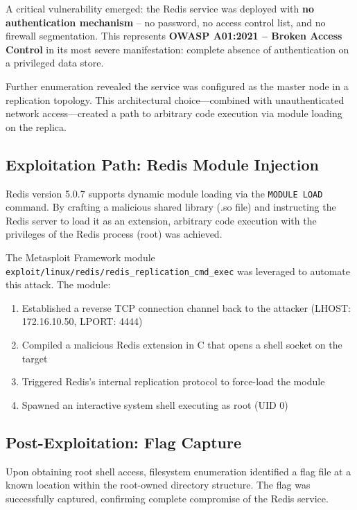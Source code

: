 \documentclass[11pt,a4paper]{article}
\begin{document}
A critical vulnerability emerged: the Redis service was deployed with \textbf{no authentication mechanism} -- no password, no access control list, and no firewall segmentation. This represents \textbf{OWASP A01:2021 -- Broken Access Control} in its most severe manifestation: complete absence of authentication on a privileged data store.

Further enumeration revealed the service was configured as the master node in a replication topology. This architectural choice—combined with unauthenticated network access—created a path to arbitrary code execution via module loading on the replica.

\subsection{Exploitation Path: Redis Module Injection}

Redis version 5.0.7 supports dynamic module loading via the \texttt{MODULE LOAD} command. By crafting a malicious shared library (.so file) and instructing the Redis server to load it as an extension, arbitrary code execution with the privileges of the Redis process (root) was achieved.

The Metasploit Framework module \texttt{exploit/linux/redis/redis\_replication\_cmd\_exec} was leveraged to automate this attack. The module:

\begin{enumerate}
    \item Established a reverse TCP connection channel back to the attacker (LHOST: 172.16.10.50, LPORT: 4444)
    \item Compiled a malicious Redis extension in C that opens a shell socket on the target
    \item Triggered Redis's internal replication protocol to force-load the module
    \item Spawned an interactive system shell executing as root (UID 0)
\end{enumerate}

\subsection{Post-Exploitation: Flag Capture}

Upon obtaining root shell access, filesystem enumeration identified a flag file at a known location within the root-owned directory structure. The flag was successfully captured, confirming complete compromise of the Redis service.
\end{document}
